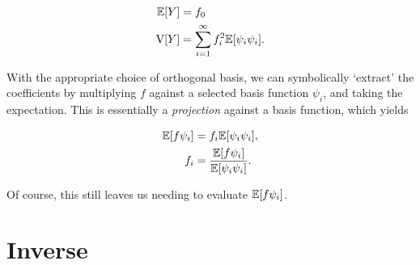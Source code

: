 \documentclass[../primer.tex]{subfiles}
\begin{document}
\begin{equation} \begin{aligned}
  \mathbb{E}[Y] &= f_0 \\
  \mathrm{V}[Y] &= \sum_{i=1}^{\infty} f_i^2 \mathbb{E}[\psi_i\psi_i].
\end{aligned} \end{equation}

With the appropriate choice of orthogonal basis, we can symbolically `extract'
the coefficients by multiplying $f$ against a selected basis function $\psi_i$,
and taking the expectation. This is essentially a \emph{projection} against a
basis function, which yields

\begin{equation} \begin{aligned}
  \mathbb{E}[f \psi_i] &= f_i \mathbb{E}[\psi_i \psi_i], \\
  f_i &= \frac{\mathbb{E}[f \psi_i]}{\mathbb{E}[\psi_i \psi_i]}.
\end{aligned} \end{equation}

\noindent Of course, this still leaves us needing to evaluate $\mathbb{E}[f \psi_i]$.

\section{Inverse}
\end{document}
